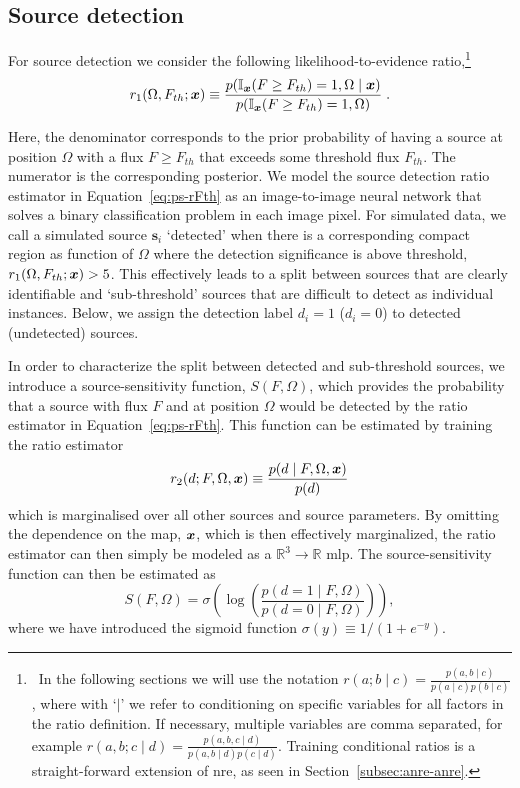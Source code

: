 \subsection{Source detection} \label{subsec:ps-detection}
For source detection we consider the following likelihood-to-evidence ratio,\footnote{
    \ In the following sections we will use the notation 
    $r(a; b\mid c) = \frac{p(a,b\mid c)}{p(a\mid c)p(b\mid c)}$, 
    where with `$\mid $' we refer to conditioning on specific variables for all factors in the ratio definition. If necessary, multiple variables are comma separated, for example $r(a, b; c\mid  d) = \frac{p(a, b, c\mid d)}{p(a, b\mid d)p(c\mid d)}$. Training conditional ratios is a straight-forward extension of \gls*{nre}, as seen in Section~\ref{subsec:anre-anre}.
}
\begin{equation}
    { r_1(\Omega, F_{th}; \ensuremath{\bm{x}})} 
    \equiv \frac{
    p(\mathbb{I}_{\bm{x}}(F \geq F_{th})=1, \Omega\mid \bm{x})
    }{
    p(\mathbb{I}_{\bm{x}}(F \geq F_{th})=1, \Omega)
    }\;.
    \label{eq:ps-rFth}
\end{equation}

Here, the denominator corresponds to the prior probability of having a source at position $\Omega$ with a flux $F\geq F_{th}$ that exceeds some threshold flux $F_{th}$.  The numerator is the corresponding posterior. We model the source detection ratio estimator in Equation~\eqref{eq:ps-rFth} as an image-to-image neural network that solves a binary classification problem in each image pixel. 
For simulated data, we call a simulated source $\boldsymbol{s}_i$ `detected' when there is a corresponding compact region as function of $\Omega$ where the detection significance is above threshold, ${ r_1(\Omega, F_{th}; \bm{x})} > 5$. This effectively leads to a split between sources that are clearly identifiable and `sub-threshold' sources that are difficult to detect as individual instances.
Below, we assign the detection label $d_i = 1$ ($d_i = 0$) to detected (undetected) sources.

In order to characterize the split between detected and sub-threshold sources, we introduce a source-sensitivity function, $S(F, \Omega)$, which provides the probability that a source with flux $F$ and at position $\Omega$ would be detected by the ratio estimator in Equation~\eqref{eq:ps-rFth}.  This function can be estimated by training the ratio estimator
\begin{equation}
    { r_2(d;F, \Omega, \ensuremath{\bm{x}})}
    \equiv \frac{p(d\mid  F, \Omega, \bm{x})}
    {p(d)}
    \label{eq:ps-rd}
\end{equation}
which is marginalised over all other sources and source parameters. By omitting the dependence on the map, $\bm{x}$, which is then effectively marginalized, the ratio estimator can then simply be modeled as a $\mathbb{R}^3 \to \mathbb{R}$ \gls*{mlp}. The source-sensitivity function can then be estimated as 
\begin{equation}
S(F, \Omega) = \sigma\left(\log \left(\frac{p(d=1\mid F, \Omega)}{p(d=0\mid F, \Omega)}\right)\right),
\end{equation}
where we have introduced the sigmoid function $\sigma(y) \equiv 1 / (1 + e^{-y})$. 

